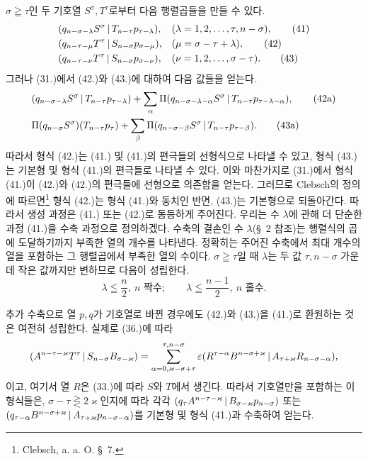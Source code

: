 $\sigma\geqq\tau$인 두 기호열 $S^\sigma,T^\tau$로부터 다음 행렬곱들을 만들 수 있다.
\begin{align}
&(q_{n-\sigma-\lambda}S^\sigma\,|\,T_{n-\tau}p_{\tau-\lambda}), &&(\lambda=1,2,\ldots,\tau,n-\sigma),\tag{41}\\
&(q_{n-\tau-\mu}T^\tau\,|\,S_{n-\sigma}p_{\sigma-\mu}), &&(\mu=\sigma-\tau+\lambda),\tag{42}\\
&(q_{n-\tau-\nu}T^\tau\,|\,S_{n-\sigma}p_{\sigma-\nu}), &&(\nu=1,2,\ldots,\sigma-\tau).
\tag{43}
\end{align}
그러나 (31.)에서 (42.)와 (43.)에 대하여 다음 값들을 얻는다.
\begin{align}
&(q_{n-\sigma-\lambda}S^\sigma\,|\,T_{n-\tau}p_{\tau-\lambda})
 +\sum_{\alpha}\Pi(q_{n-\sigma-\lambda-\alpha}S^\sigma\,|\,T_{n-\tau}p_{\tau-\lambda-\alpha}),\tag{42a}\\
&\Pi(q_{n-\sigma}S^\sigma)(T_{n-\tau}p_\tau)
 +\sum_{\beta}\Pi(q_{n-\sigma-\beta}S^\sigma\,|\,T_{n-\tau}p_{\tau-\beta}).
\tag{43a}
\end{align}
따라서 형식 (42.)는 (41.) 및 (41.)의 편극들의 선형식으로 나타낼 수 있고, 형식 (43.)는 기본형 및 형식 (41.)의 편극들로 나타낼 수 있다. 이와 마찬가지로 (31.)에서 형식 (41.)이 (42.)와 (42.)의 편극들에 선형으로 의존함을 얻는다. 그러므로 Clebsch의 정의에 따르면\footnote{Clebsch, a. a. O. \S\ 7.} 형식 (42.)는 형식 (41.)와 동치인 반면, (43.)는 기본형으로 되돌아간다. 따라서 생성 과정은 (41.) 또는 (42.)로 동등하게 주어진다. 우리는 수 $\lambda$에 관해 더 단순한 과정 (41.)을 수축 과정으로 정의하겠다. 수축의 결손인 수 $\lambda$(\S\ 2 참조)는 행렬식의 곱에 도달하기까지 부족한 열의 개수를 나타낸다. 정확히는 주어진 수축에서 최대 개수의 열을 포함하는 그 행렬곱에서 부족한 열의 수이다. $\sigma\geqq\tau$일 때 $\lambda$는 두 값 $\tau,n-\sigma$ 가운데 작은 값까지만 변하므로 다음이 성립한다.
\begin{equation}
 \lambda\leqq\frac n2,\ n\text{ 짝수};\qquad
 \lambda\leqq\frac{n-1}{2},\ n\text{ 홀수}.
\tag{44}
\end{equation}

추가 수축으로 열 $p,q$가 기호열로 바뀐 경우에도 (42.)와 (43.)을 (41.)로 환원하는 것은 여전히 성립한다. 실제로 (36.)에 따라
\[
 (A^{n-\tau-\varkappa}T^\tau\,|\,S_{n-\sigma}B_{\sigma-\varkappa})
 =\sum_{\alpha=0,\varkappa-\sigma+\tau}^{\tau,n-\sigma}
 \varepsilon(R^{\tau-\alpha}B^{n-\sigma+\varkappa}\,|\,A_{\tau+\varkappa}R_{n-\sigma-\alpha}),
\]
이고, 여기서 열 $R$은 (33.)에 따라 $S$와 $T$에서 생긴다. 따라서 기호열만을 포함하는 이 형식들은, $\sigma-\tau\gtreqless 2\varkappa$인지에 따라 각각 $(q_\tau A^{n-\tau-\varkappa}\,|\,B_{\sigma-\varkappa}p_{n-\sigma})$ 또는 $(q_{\tau-\alpha}B^{n-\sigma+\varkappa}\,|\,A_{\tau+\varkappa}p_{n-\sigma-\alpha})$를 기본형 및 형식 (41.)과 수축하여 얻는다.

